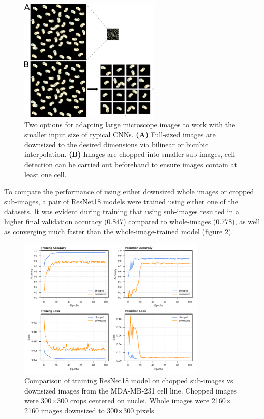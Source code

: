 \documentclass[a4paper,11pt,twoside,openright]{scrbook}
\begin{document}
\begin{figure}
    \includegraphics[width=0.6\textwidth]{ch2ImageChopping}
    \captionsetup{width=0.8\textwidth}
    \caption[Down-sizing and chopping images for CNN training]{Two options for adapting large microscope images to work with the smaller input size of typical CNNs. \textbf{(A)} Full-sized images are downsized to the desired dimensions via bilinear or bicubic interpolation. \textbf{(B)} Images are chopped into smaller sub-images, cell detection can be carried out beforehand to ensure images contain at least one cell.}
    \label{figure:image_chopping}
\end{figure}

To compare the performance of using either downsized whole images or cropped sub-images, a pair of ResNet18 models were trained using either one of the datasets.
It was evident during training that using sub-images resulted in a higher final validation accuracy (0.847) compared to whole-images (0.778), as well as converging much faster than the whole-image-trained model (figure \ref{figure:nn_chopped_vs_whole_curves}).

\begin{figure}
    \includegraphics[width=0.8\textwidth]{ch2choppedVsWhole}
    \captionsetup{width=0.8\textwidth}
    \caption[Comparison of whole images vs sub-images]{
Comparison of training ResNet18 model on chopped sub-images vs downsized images from the MDA-MB-231 cell line.
Chopped images were 300$\times$300 crops centered on nuclei.
Whole images were 2160$\times$2160 images downsized to 300$\times$300 pixels.
}
    \label{figure:nn_chopped_vs_whole_curves}
\end{figure}
\end{document}
